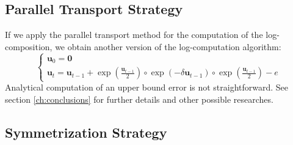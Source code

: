 \subsection{Parallel Transport Strategy}

If we apply the parallel transport method for the computation of the log-composition, we obtain another version of the log-computation algorithm:
\begin{equation}\label{eq:parallel_strategy}
\begin{cases}
\mathbf{u}_0 = \mathbf{0} \\
\mathbf{u}_{t} = \mathbf{u}_{t-1} + \exp(\frac{\mathbf{u}_{t-1}}{2}) \circ \exp(-\delta \mathbf{u}_{t-1}) \circ \exp(\frac{\mathbf{u}_{t-1}}{2}) - e
\end{cases}
\end{equation}
Analytical computation of an upper bound error is not straightforward. See section \ref{ch:conclusions} for further details and other possible researches.

\subsection{Symmetrization Strategy}


